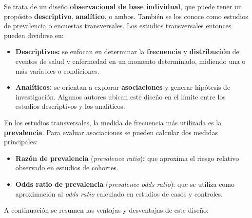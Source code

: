 \documentclass[
  spanish,
  a4paper,
]{scrbook}
\begin{document}
Se trata de un diseño \textbf{observacional de base individual}, que
puede tener un propósito \textbf{descriptivo}, \textbf{analítico}, o
ambos. También se los conoce como estudios de prevalencia o encuestas
transversales. Los estudios transversales entonces pueden dividirse en:

\begin{itemize}
\item
  \textbf{Descriptivos:} se enfocan en determinar la \textbf{frecuencia}
  y \textbf{distribución} de eventos de salud y enfermedad en un momento
  determinado, midiendo una o más variables o condiciones.
\item
  \textbf{Analíticos:} se orientan a explorar \textbf{asociaciones} y
  generar hipótesis de investigación. Algunos autores ubican este diseño
  en el límite entre los estudios descriptivos y los analíticos.
\end{itemize}

En los estudios transversales, la medida de frecuencia más utilizada es
la \textbf{prevalencia}. Para evaluar asociaciones se pueden calcular
dos medidas principales:

\begin{itemize}
\item
  \textbf{Razón de prevalencia} (\emph{prevalence ratio})\textbf{:} que
  aproxima el riesgo relativo observado en estudios de cohortes.
\item
  \textbf{Odds ratio de prevalencia} (\emph{prevalence odds ratio}): que
  se utiliza como aproximación al \emph{odds ratio} calculado en
  estudios de casos y controles.
\end{itemize}

A continuación se resumen las ventajas y desventajas de este diseño:
\end{document}
